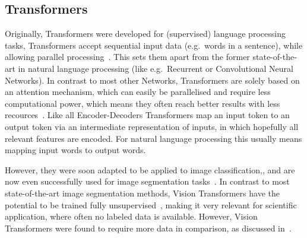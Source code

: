 \subsection{Transformers} \label{subsec:transformer}
Originally, Transformers were developed for (supervised) language processing tasks, Transformers accept sequential input data (e.g.~words in a sentence), while allowing parallel processing~\autocite{Vaswani2017}.
This sets them apart from the former state-of-the-art in natural language processing (like e.g.~Recurrent or Convolutional Neural Networks).
In contrast to most other Networks, Transformers are solely based on an attention mechanism, which can easily be parallelised and require less computational power, which means they often reach better results with less recources~\autocite{Vaswani2017}.
Like all Encoder-Decoders Transformers map an input token to an output token via an intermediate representation of inputs, in which hopefully all relevant features are encoded.
For natural language processing this usually means mapping input words to output words.

However, they were soon adapted to be applied to image classification,, and are now even successfully used for image segmentation tasks~\autocite{Liu2019}.
In contrast to most state-of-the-art image segmentation methods, Vision Transformers have the potential to be trained fully unsupervised~\autocite{Hamilton2022}, making it very relevant for scientific application, where often no labeled data is available.
However, Vision Transformers were found to require more data in comparison, as discussed in~\autocite{Coccomini2021}.

